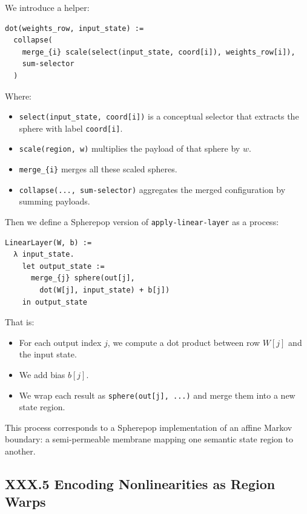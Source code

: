 \documentclass[12pt,letterpaper]{article}
\begin{document}
We introduce a helper:

\begin{verbatim}
dot(weights_row, input_state) :=
  collapse(
    merge_{i} scale(select(input_state, coord[i]), weights_row[i]),
    sum-selector
  )
\end{verbatim}

Where:

\begin{itemize}
  \item \verb|select(input_state, coord[i])| is a conceptual selector that extracts the sphere with label \verb|coord[i]|.
  \item \verb|scale(region, w)| multiplies the payload of that sphere by $w$.
  \item \verb|merge_{i}| merges all these scaled spheres.
  \item \verb|collapse(..., sum-selector)| aggregates the merged configuration by summing payloads.
\end{itemize}

Then we define a Spherepop version of \texttt{apply-linear-layer} as a process:

\begin{verbatim}
LinearLayer(W, b) :=
  λ input_state.
    let output_state :=
      merge_{j} sphere(out[j],
        dot(W[j], input_state) + b[j])
    in output_state
\end{verbatim}

That is:

\begin{itemize}
  \item For each output index $j$, we compute a dot product between row $W[j]$ and the input state.
  \item We add bias $b[j]$.
  \item We wrap each result as \verb|sphere(out[j], ...)| and merge them into a new state region.
\end{itemize}

This process corresponds to a Spherepop implementation of an affine Markov boundary: a semi-permeable membrane mapping one semantic state region to another.

\subsection{XXX.5 Encoding Nonlinearities as Region Warps}
\end{document}
